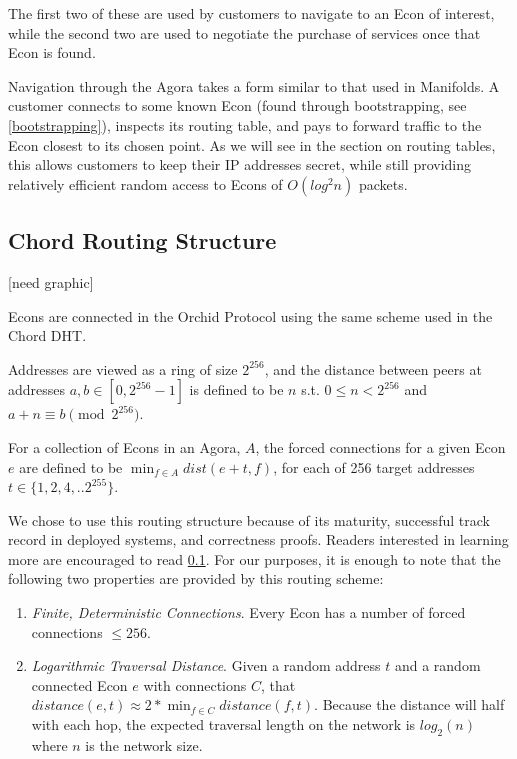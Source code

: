 \documentclass{article}
\newcommand{\mesh}{Orchid}
\begin{document}
The first two of these are used by customers to navigate to an Econ of
interest, while the second two are used to negotiate the purchase of
services once that Econ is found.

Navigation through the Agora takes a form similar to that used in
Manifolds. A customer connects to some known Econ (found through
bootstrapping, see \ref{bootstrapping}), inspects its routing table,
and pays to forward traffic to the Econ closest to its chosen
point. As we will see in the section on routing tables, this allows
customers to keep their IP addresses secret, while still providing
relatively efficient random access to Econs of $O(log^2 n)$ packets.

\subsection{Chord Routing Structure}

[need graphic]

Econs are connected in the \mesh{} Protocol using the same scheme used
in the Chord DHT.

Addresses are viewed as a ring of size $2^{256}$, and the distance
between peers at addresses $a, b \in [0, 2^{256}-1]$ is defined to be
$n$ s.t. $0 \leq n < 2^{256}$ and $a + n \equiv b \pmod{2^{256}}$.

For a collection of Econs in an Agora, $A$, the forced connections for
a given Econ $e$ are defined to be $\min_{f \in A} dist(e+t, f)$, for
each of 256 target addresses $t \in \{1, 2, 4, .. 2^{255}\}$.

We chose to use this routing structure because of its maturity,
successful track record in deployed systems, and correctness
proofs. Readers interested in learning more are encouraged to read
\ref{}. For our purposes, it is enough to note that the following two
properties are provided by this routing scheme:

\begin{enumerate}
\item \emph{Finite, Deterministic Connections}. Every Econ has a
  number of forced connections $\leq 256$.
\item \emph{Logarithmic Traversal Distance}. Given a random address
  $t$ and a random connected Econ $e$ with connections $C$, that
  $distance(e, t) \approx 2 * \min_{f \in C} distance(f, t)$. Because
  the distance will half with each hop, the expected traversal length
  on the network is $log_2(n)$ where $n$ is the network size.
\end{enumerate}
\end{document}

